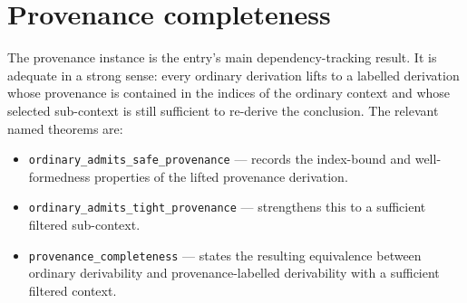 \documentclass[11pt,a4paper]{article}
\begin{document}
\section{Provenance completeness}
The provenance instance is the entry's main dependency-tracking result.
It is adequate in a strong sense: every ordinary derivation lifts to a
labelled derivation whose provenance is contained in the indices of the
ordinary context and whose selected sub-context is still sufficient to
re-derive the conclusion.  The relevant named theorems are:

\begin{sloppypar}
\begin{itemize}
  \item \texttt{ordinary\_admits\_safe\_provenance} ---
        records the index-bound and well-formedness properties of the
        lifted provenance derivation.
  \item \texttt{ordinary\_admits\_tight\_provenance} ---
        strengthens this to a sufficient filtered sub-context.
  \item \texttt{provenance\_completeness} ---
        states the resulting equivalence between ordinary derivability
        and provenance-labelled derivability with a sufficient filtered
        context.
\end{itemize}
\end{sloppypar}





\end{document}
